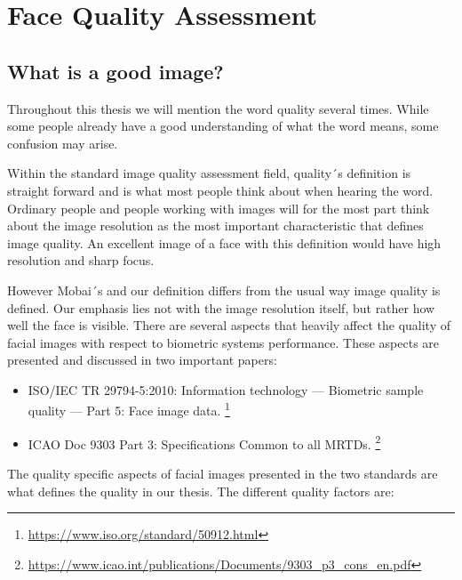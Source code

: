 \chapter{Face Quality Assessment}
\label{chap:FQA}

\section{What is a good image?}
\label{sec:setup}
Throughout this thesis we will mention the word quality several times. While some people already have a good understanding of what the word means, some confusion may arise. 

Within the standard image quality assessment field, quality´s definition is straight forward and is what most people think about when hearing the word. Ordinary people and people working with images will for the most part think about the image resolution as the most important characteristic that defines image quality. An excellent image of a face with this definition would have high resolution and sharp focus.   

However Mobai´s and our definition differs from the usual way image quality is defined. Our emphasis lies not with the image resolution itself, but rather how well the face is visible. There are several aspects that heavily affect the quality of facial images with respect to biometric systems performance. These aspects are presented and discussed in two important papers: 

\begin{itemize}
    \item ISO/IEC TR 29794-5:2010: Information technology — Biometric sample quality — Part 5: Face image data. \footnote{\url{https://www.iso.org/standard/50912.html}}
    \item ICAO Doc 9303 Part 3: Specifications Common to all MRTDs. \footnote{\url{https://www.icao.int/publications/Documents/9303_p3_cons_en.pdf}}
\end{itemize}

The quality specific aspects of facial images presented in the two standards are what defines the quality in our thesis. The different quality factors are:  

